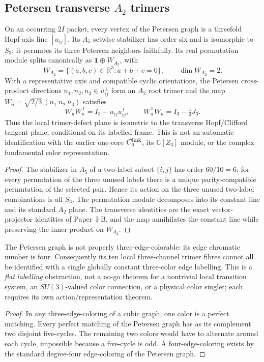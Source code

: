 \documentclass[12pt,a4paper]{article}
\begin{document}
\subsection{Petersen transverse $A_2$ trimers}
\label{p2e:sec:v318-petersen-trimer-grammar}
\begin{theorem}
\label{p2e:thm:v318-local-petersen-trimer}
On an occurring $2I$ packet, every vertex of the Petersen graph is a
threefold Hopf-axis line $[u_{ij}]$.  Its $A_5$ setwise stabilizer has
order six and is isomorphic to $S_3$; it permutes its three
Petersen neighbors faithfully.  Its real permutation module splits
canonically as $\mathbf1\oplus W_{A_2}$, with
\[
 W_{A_2}=\{(a,b,c)\in\mathbb R^3:a+b+c=0\},
 \qquad\dim W_{A_2}=2.
\]
With a representative axis and compatible cyclic orientations, the
Petersen cross-product directions $n_1,n_2,n_3\in u_{ij}^{\perp}$
form an $A_2$ root trimer and the map
$W_u=\sqrt{2/3}\,(n_1\ n_2\ n_3)$ satisfies
\[
 W_uW_u^{\mathsf T}=I_3-u_{ij}u_{ij}^{\mathsf T},\qquad
 W_u^{\mathsf T}W_u=I_3-\tfrac13J_3.
\]
Thus the local trimer-defect plane is isometric to the transverse
Hopf/Clifford tangent plane, conditional on its labelled frame.
This is not an automatic identification with the earlier one-core
$C_6^{\rm link}$, its $\mathbb C[Z_3]$ module, or the complex
fundamental color representation.
\end{theorem}
\begin{proof}
The stabilizer in $A_5$ of a two-label subset $\{i,j\}$ has
order $60/10=6$; for every permutation of the three unused labels
there is a unique parity-compatible permutation of the selected pair.
Hence its action on the three unused two-label combinations is all
$S_3$.  The permutation module decomposes into its constant
line and its standard $A_2$ plane.  The transverse identities are
the exact vector-projector identities of Paper~I-B, and the map
annihilates the constant line while preserving the inner product
on $W_{A_2}$.
\end{proof}

\begin{proposition}
\label{p2e:prop:v318-snark-no-flat-trimer}
The Petersen graph is not properly three-edge-colorable: its edge
chromatic number is four.  Consequently its ten local three-channel
trimer fibres cannot all be identified with a single globally
constant three-color edge labelling.  This is a \emph{flat labelling}
obstruction, not a no-go theorem for a nontrivial local transition
system, an $SU(3)$-valued color connection, or a physical color
singlet; each requires its own action/representation theorem.
\end{proposition}
\begin{proof}
In any three-edge-coloring of a cubic graph, one color is a
perfect matching.  Every perfect matching of the Petersen graph
has as its complement two disjoint five-cycles.  The remaining
two colors would have to alternate around each cycle, impossible
because a five-cycle is odd.  A four-edge-coloring exists by the
standard degree-four edge-coloring of the Petersen graph.
\end{proof}
\end{document}
